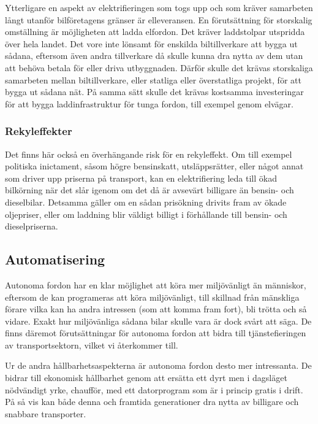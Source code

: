 \documentclass{article}
\begin{document}
Ytterligare en aspekt av elektrifieringen som togs upp och som kräver samarbeten långt utanför bil\-företagens gränser är elleveransen. En förutsättning för storskalig omställning är möjligheten att ladda elfordon. Det kräver laddstolpar utspridda över hela landet. Det vore inte lönsamt för enskilda biltillverkare att bygga ut sådana, eftersom även andra tillverkare då skulle kunna dra nytta av dem utan att behöva betala för eller driva utbyggnaden. Därför skulle det krävas storskaliga samarbeten mellan biltillverkare, eller statliga eller överstatliga projekt, för att bygga ut sådana nät. På samma sätt skulle det krävas kostsamma investeringar för att bygga laddinfrastruktur för tunga fordon, till exempel genom elvägar.

\subsubsection{Rekyleffekter}

Det finns här också en överhängande risk för en rekyleffekt. Om till exempel politiska inictament, såsom högre bensinskatt, utsläppsrätter, eller något annat som driver upp priserna på transport, kan en elektrifiering leda till ökad bilkörning när det slår igenom om det då är avsevärt billigare än bensin- och dieselbilar. Detsamma gäller om en sådan prisökning drivits fram av ökade oljepriser, eller om laddning blir väldigt billigt i förhållande till bensin- och dieselpriserna.

\subsection{Automatisering}

Autonoma fordon har en klar möjlighet att köra mer miljövänligt än människor, eftersom de kan programeras att köra miljövänligt, till skillnad från mänskliga förare vilka kan ha andra intressen (som att komma fram fort), bli trötta och så vidare. Exakt hur miljövänliga sådana bilar skulle vara är dock svårt att säga. De finns däremot förutsättningar för autonoma fordon att bidra till tjänstefieringen av transportsektorn, vilket vi återkommer till.

Ur de andra hållbarhetsaspekterna är autonoma fordon desto mer intressanta. De bidrar till ekonomisk hållbarhet genom att ersätta ett dyrt men i dagsläget nödvändigt yrke, chaufför, med ett datorprogram som är i princip gratis i drift. På så vis kan både denna och framtida generationer dra nytta av billigare och snabbare transporter.
\end{document}
